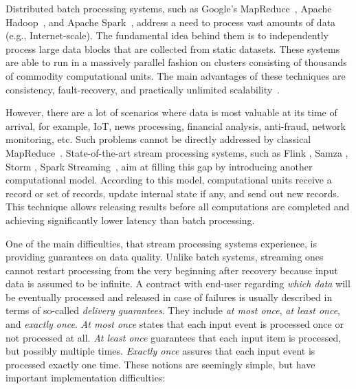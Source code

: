 
\label {fs-intro-seciton}

Distributed batch processing systems, such as Google's MapReduce~\cite{Dean:2008:MSD:1327452.1327492}, Apache Hadoop~\cite{hadoop2009hadoop}, and Apache Spark~\cite{Zaharia:2016:ASU:3013530.2934664}, address a need to process vast amounts of data (e.g., Internet-scale). The fundamental idea behind them is to independently process large data blocks that are collected from static datasets. These systems are able to run in a massively parallel fashion on clusters consisting of thousands of commodity computational units. The main advantages of these techniques are consistency, fault-recovery, and practically unlimited scalability~\cite{borthakur2011apache}.

However, there are a lot of scenarios where data is most valuable at its time of arrival, for example, IoT, news processing, financial analysis, anti-fraud, network monitoring, etc. Such problems cannot be directly addressed by classical MapReduce~\cite{Doulkeridis:2014:SLA:2628707.2628782}. State-of-the-art stream processing systems, such as Flink \cite{carbone2015apache}, Samza \cite{Noghabi:2017:SSS:3137765.3137770}, Storm \cite{apache:storm}, Spark Streaming~\cite{Zaharia:2012:DSE:2342763.2342773}, aim at filling this gap by introducing another computational model. According to this model, computational units receive a record or set of records, update internal state if any, and send out new records. This technique allows releasing results before all computations are completed and achieving significantly lower latency than batch processing. 

One of the main difficulties, that stream processing systems experience, is providing guarantees on data quality. Unlike batch systems, streaming ones cannot restart processing from the very beginning after recovery because input data is assumed to be infinite. A contract with end-user regarding {\em which data} will be eventually processed and released in case of failures is usually described in terms of so-called {\em delivery guarantees}. They include {\em at most once}, {\em at least once}, and {\em exactly once}. {\it At most once} states that each input event is processed once or not processed at all. {\it At least once} guarantees that each input item is processed, but possibly multiple times. {\it Exactly once} assures that each input event is processed exactly one time. These notions are seemingly simple, but have important implementation difficulties:

